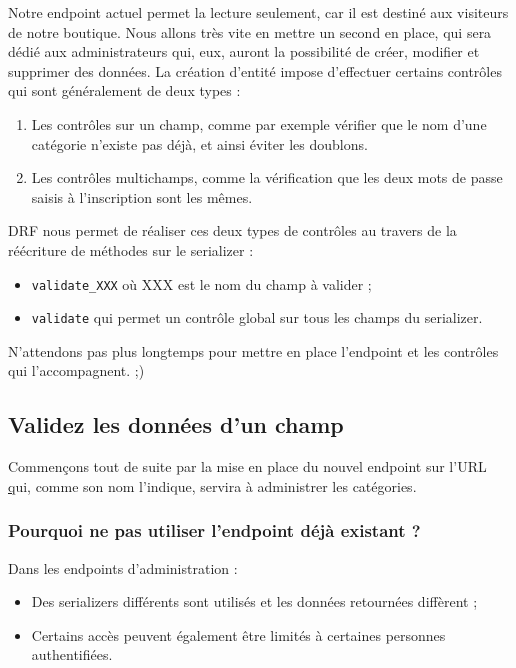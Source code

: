 \documentclass[a4paper]{article}
\begin{document}
Notre endpoint actuel permet la lecture seulement, car il est destiné aux visiteurs de notre boutique. Nous allons très vite en mettre un second en place, qui sera dédié aux {\color{monOrange}administrateurs} qui, eux, auront la possibilité de {\color{monOrange}créer, modifier et supprimer} des données. La création d’entité impose d’effectuer certains contrôles qui sont généralement de deux types :
\begin{enumerate}
\item Les contrôles {\color{monOrange}sur un champ}, comme par exemple vérifier que le nom d’une catégorie n'existe pas déjà, et ainsi éviter les doublons.
\item Les contrôles {\color{monOrange}multichamps}, comme la vérification que les deux mots de passe saisis à l’inscription sont les mêmes.
\end{enumerate}
DRF nous permet de réaliser ces deux types de contrôles au travers de la réécriture de méthodes sur le serializer :
\begin{itemize}
\item {\tt validate\_XXX}  où XXX est le nom du champ à valider ;
\item {\tt validate}  qui permet un contrôle global sur tous les champs du serializer.
\end{itemize}
N’attendons pas plus longtemps pour mettre en place l'endpoint et les contrôles qui l’accompagnent. ;)

\subsection{Validez les données d’un champ}
Commençons tout de suite par la mise en place du nouvel endpoint sur l’URL \href{http://127.0.0.1:8000/api/admin/category/}  qui, comme son nom l’indique, servira à administrer les catégories.
\subsubsection*{Pourquoi ne pas utiliser l’endpoint déjà existant ?}
 Dans les endpoints d’administration :
\begin{itemize}
\item Des serializers différents sont utilisés et les données retournées diffèrent ;
\item Certains accès peuvent également être limités à certaines personnes authentifiées.
\end{itemize}
 
\end{document}
